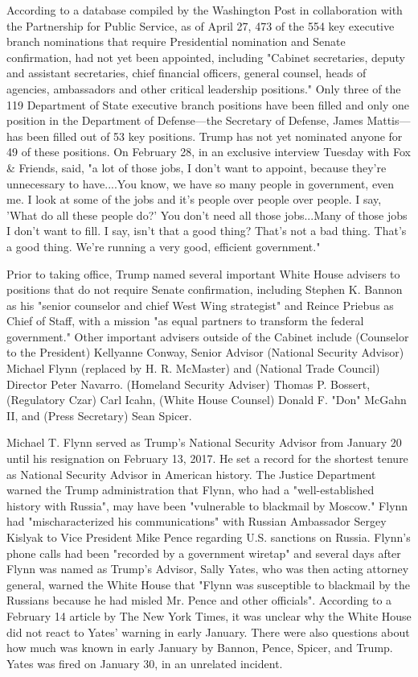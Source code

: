 According to a database compiled by the Washington Post in collaboration
with the Partnership for Public Service, as of April 27, 473 of the 554
key executive branch nominations that require Presidential nomination
and Senate confirmation, had not yet been appointed, including "Cabinet
secretaries, deputy and assistant secretaries, chief financial officers,
general counsel, heads of agencies, ambassadors and other critical
leadership positions." Only three of the 119 Department of State
executive branch positions have been filled and only one position in the
Department of Defense---the Secretary of Defense, James Mattis---has
been filled out of 53 key positions. Trump has not yet nominated anyone
for 49 of these positions. On February 28, in an exclusive interview
Tuesday with Fox \& Friends, said, "a lot of those jobs, I don't want to
appoint, because they're unnecessary to have....You know, we have so
many people in government, even me. I look at some of the jobs and it's
people over people over people. I say, 'What do all these people do?'
You don't need all those jobs...Many of those jobs I don't want to fill.
I say, isn't that a good thing? That's not a bad thing. That's a good
thing. We're running a very good, efficient government."

Prior to taking office, Trump named several important White House
advisers to positions that do not require Senate confirmation, including
Stephen K. Bannon as his "senior counselor and chief West Wing
strategist" and Reince Priebus as Chief of Staff, with a mission "as
equal partners to transform the federal government." Other important
advisers outside of the Cabinet include (Counselor to the President)
Kellyanne Conway, Senior Advisor (National Security Advisor) Michael
Flynn (replaced by H. R. McMaster) and (National Trade Council) Director
Peter Navarro. (Homeland Security Adviser) Thomas P. Bossert,
(Regulatory Czar) Carl Icahn, (White House Counsel) Donald F. "Don"
McGahn II, and (Press Secretary) Sean Spicer.

Michael T. Flynn served as Trump's National Security Advisor from
January 20 until his resignation on February 13, 2017. He set a record
for the shortest tenure as National Security Advisor in American
history. The Justice Department warned the Trump administration that
Flynn, who had a "well-established history with Russia", may have been
"vulnerable to blackmail by Moscow." Flynn had "mischaracterized his
communications" with Russian Ambassador Sergey Kislyak to Vice President
Mike Pence regarding U.S. sanctions on Russia. Flynn's phone calls had
been "recorded by a government wiretap" and several days after Flynn was
named as Trump's Advisor, Sally Yates, who was then acting attorney
general, warned the White House that "Flynn was susceptible to blackmail
by the Russians because he had misled Mr. Pence and other officials".
According to a February 14 article by The New York Times, it was unclear
why the White House did not react to Yates' warning in early January.
There were also questions about how much was known in early January by
Bannon, Pence, Spicer, and Trump. Yates was fired on January 30, in an
unrelated incident.


